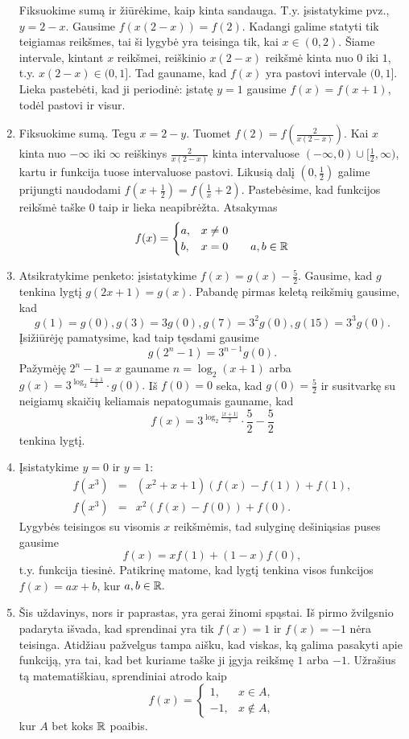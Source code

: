 \begin{enumerate}
Fiksuokime sumą ir žiūrėkime, kaip kinta sandauga. T.y. įsistatykime
pvz., $y=2-x$. Gausime $f(x(2-x))=f(2)$. Kadangi galime statyti tik
teigiamas reikšmes, tai ši lygybė yra teisinga tik, kai $x\in (0,2)$.
Šiame intervale, kintant $x$ reikšmei, reiškinio $x(2-x)$ reikšmė kinta
nuo $0$ iki $1$, t.y. $x(2-x)\in(0,1]$. Tad gauname, kad $f(x)$ yra
pastovi intervale $(0,1]$. Lieka pastebėti, kad ji periodinė: įstatę
$y=1$ gausime $f(x)=f(x+1)$, todėl pastovi ir visur.
\item 
Fiksuokime sumą. Tegu $x=2-y$. Tuomet $f(2)=f(\frac{2}{x(2-x)})$.
Kai $x$ kinta nuo $-\infty$ iki $\infty$ reiškinys
$\frac{2}{x(2-x)}$ kinta intervaluose
$(-\infty,0)\cup[\frac{1}{2},\infty)$, kartu ir funkcija tuose
intervaluose pastovi. Likusią dalį $(0,\frac{1}{2})$ galime
prijungti naudodami $f(x+\frac{1}{2}) = f(\frac{1}{x}+2)$.
Pastebėsime, kad funkcijos reikšmė taške 0 taip ir lieka
neapibrėžta. Atsakymas $$f(x) = \begin{cases}a,& x\neq0 \\ b,& x= 0
\text{      \ \ \ \ \   } a,b\in\mathbb R\end{cases}$$
\item 
Atsikratykime penketo: įsistatykime $f(x) = g(x) -\frac{5}{2}$.
Gausime, kad $g$ tenkina lygtį $g(2x+1)=g(x)$. Pabandę pirmas keletą
reikšmių gausime, kad $$g(1)=g(0), g(3)=3g(0), g(7)=3^2g(0), g(15) =
3^3g(0).$$ Įsižiūrėję pamatysime, kad taip tęsdami gausime
$$g(2^n-1)=3^{n-1}g(0).$$ Pažymėję $2^n-1 = x$ gauname $n =
\log_2(x+1)$ arba $g(x)=3^{\log_2\frac{x+1}{2}}\cdot g(0).$ Iš
$f(0)=0$ seka, kad $g(0)=\frac{5}{2}$ ir susitvarkę su neigiamų
skaičių keliamais nepatogumais gauname, kad  $$f(x) =
3^{\log_2\frac{|x+1|}{2}}\cdot \frac{5}{2} - \frac{5}{2}$$ tenkina
lygtį.
\item 
Įsistatykime $y=0$ ir $y=1$:
\begin{eqnarray*}
  f(x^3) &=& (x^2 + x + 1)(f(x)-f(1))+f(1),\\
  f(x^3) &=& x^2 (f(x)-f(0)) + f(0).
\end{eqnarray*}
Lygybės teisingos su visomis $x$ reikšmėmis, tad sulyginę dešiniąsias
puses gausime $$f(x)=xf(1) + (1-x)f(0),$$ t.y. funkcija tiesinė.
Patikrinę matome, kad lygtį tenkina visos funkcijos $f(x)=ax+b$, kur
$a,b\in \mathbb R.$
\item 
Šis uždavinys, nors ir paprastas, yra gerai žinomi spąstai. Iš pirmo
žvilgsnio padaryta išvada, kad sprendinai yra tik $f(x)=1$ ir
$f(x)=-1$ nėra teisinga. Atidžiau pažvelgus tampa aišku, kad viskas, ką
galima pasakyti apie funkciją, yra tai, kad bet kuriame taške ji įgyja
reikšmę $1$ arba $-1$. Užrašius tą matematiškiau, sprendiniai atrodo
kaip $$f(x) = \begin{cases}1,& x\in A, \\ -1,& x\not\in A,\end{cases}$$
kur $A$ bet koks $\mathbb R$ poaibis.
\end{enumerate} 
